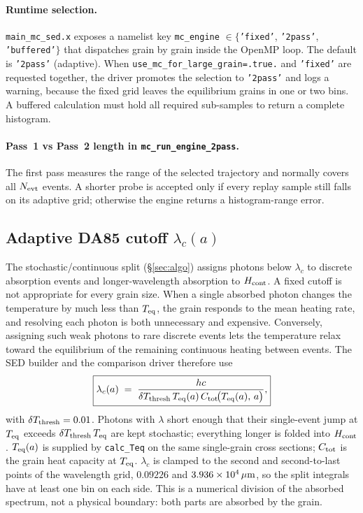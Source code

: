 \documentclass{my_memo}
\newcommand{\Ctot}{C_{\rm tot}}
\newcommand{\Teq}{T_{\rm eq}}
\newcommand{\umc}{\,\mu{\rm m}}
\newcommand{\evt}{N_{\rm evt}}
\begin{document}
\paragraph{Runtime selection.}
\verb|main_mc_sed.x| exposes a namelist key \verb|mc_engine|
$\in\{$\texttt{'fixed'}, \texttt{'2pass'}, \texttt{'buffered'}$\}$
that dispatches grain by grain inside the OpenMP loop. The
default is \texttt{'2pass'} (adaptive). When
\verb|use_mc_for_large_grain=.true.| and \texttt{'fixed'} are
requested together, the driver promotes the selection to
\texttt{'2pass'} and logs a warning, because the fixed grid leaves
the equilibrium grains in one or two bins. A buffered calculation must
hold all required sub-samples to return a complete histogram.

\paragraph{Pass~1 vs Pass~2 length in \texttt{mc\_run\_engine\_2pass}.}
The first pass measures the range of the selected trajectory and
normally covers all $\evt$ events. A shorter probe is accepted
only if every replay sample still falls on its adaptive grid; otherwise
the engine returns a histogram-range error.

\subsection{Adaptive DA85 cutoff $\lambda_c(a)$}\label{sec:adaptive_lamc}

The \citet{DraineAnderson1985} stochastic/continuous split
(\S\ref{sec:algo}) assigns photons below $\lambda_c$ to discrete
absorption events and longer-wavelength absorption to $H_{\rm cont}$.
A fixed cutoff is not appropriate for every grain size. When a single
absorbed photon changes the temperature by much less than $\Teq$, the
grain responds to the mean heating rate, and resolving each photon is
both unnecessary and expensive. Conversely, assigning such weak
photons to rare discrete events lets the temperature relax toward the
equilibrium of the remaining continuous heating between events. The
SED builder and the comparison driver therefore use
\begin{equation}\label{eq:lamc_adapt}
\boxed{\lambda_c(a) \;=\; \frac{hc}{\delta T_{\rm thresh}\,\Teq(a)\,\Ctot\!\bigl(\Teq(a),\,a\bigr)},}
\end{equation}
with $\delta T_{\rm thresh} = 0.01$. Photons with $\lambda$ short
enough that their single-event jump at $\Teq$ exceeds
$\delta T_{\rm thresh}\,\Teq$ are kept stochastic; everything longer is
folded into $H_{\rm cont}$. $\Teq(a)$ is supplied by \texttt{calc\_Teq}
on the same single-grain cross sections; $\Ctot$ is the grain heat
capacity at $\Teq$. $\lambda_c$ is clamped to the second and
second-to-last points of the wavelength grid, $0.09226$ and
$3.936\times10^4\umc$, so the split integrals have at least one bin on
each side. This is a numerical division of the absorbed spectrum, not
a physical boundary: both parts are absorbed by the grain.
\end{document}
